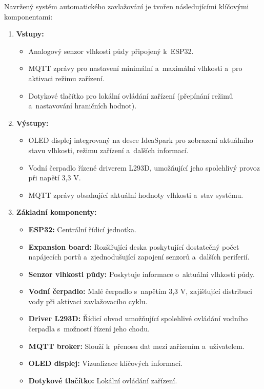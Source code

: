 \documentclass[a4paper, 11pt]{article}
\begin{document}
Navržený systém automatického zavlažování je tvořen následujícími klíčovými komponentami:
\begin{enumerate}
    \item \textbf{Vstupy:}
    \begin{itemize}
        \item Analogový senzor vlhkosti půdy připojený k~ESP32.
        \item MQTT zprávy pro nastavení minimální a~maximální vlhkosti a~pro aktivaci režimu zařízení.
        \item Dotykové tlačítko pro lokální ovládání zařízení (přepínání režimů a~nastavování hraničních hodnot).
    \end{itemize}
    \item \textbf{Výstupy:}
    \begin{itemize}
        \item OLED displej integrovaný na desce IdeaSpark pro zobrazení aktuálního stavu vlhkosti, režimu zařízení a~dalších informací.
        \item Vodní čerpadlo řízené driverem L293D, umožňující jeho spolehlivý provoz při napětí 3,3 V.
        \item MQTT zprávy obsahující aktuální hodnoty vlhkosti a~stav systému.
    \end{itemize}
    \item \textbf{Základní komponenty:}
    \begin{itemize}
        \item \textbf{ESP32:} Centrální řídicí jednotka.
        \item \textbf{Expansion board:} Rozšiřující deska poskytující dostatečný počet napájecích portů a~zjednodušující zapojení senzorů a~dalších periferií.
        \item \textbf{Senzor vlhkosti půdy:} Poskytuje informace o~aktuální vlhkosti půdy.
        \item \textbf{Vodní čerpadlo:} Malé čerpadlo s~napětím 3,3 V, zajišťující distribuci vody při aktivaci zavlažovacího cyklu.
        \item \textbf{Driver L293D:} Řídicí obvod umožňující spolehlivé ovládání vodního čerpadla s~možností řízení jeho chodu.
        \item \textbf{MQTT broker:} Slouží k~přenosu dat mezi zařízením a~uživatelem.
        \item \textbf{OLED displej:} Vizualizace klíčových informací.
        \item \textbf{Dotykové tlačítko:} Lokální ovládání zařízení.
    \end{itemize}
\end{enumerate}
\end{document}
